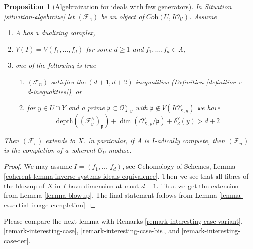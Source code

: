 \documentclass{stacks-project}
\theoremstyle{plain}
\newtheorem{proposition}[subsection]{Proposition}
\theoremstyle{definition}
\theoremstyle{remark}
\numberwithin{equation}{subsection}
\begin{document}
\begin{proposition}[Algebraization for ideals with few generators]
\label{proposition-d-generators}
In Situation \ref{situation-algebraize} let $(\mathcal{F}_n)$
be an object of $\textit{Coh}(U, I\mathcal{O}_U)$. Assume
\begin{enumerate}
\item $A$ has a dualizing complex,
\item $V(I) = V(f_1, \ldots, f_d)$ for some $d \geq 1$ and
$f_1, \ldots, f_d \in A$,
\item one of the following is true
\begin{enumerate}
\item $(\mathcal{F}_n)$ satisfies the $(d + 1, d + 2)$-inequalities
(Definition \ref{definition-s-d-inequalities}), or
\item for $y \in U \cap Y$ and a prime
$\mathfrak p \subset \mathcal{O}_{X, y}^\wedge$ with
$\mathfrak p \not \in V(I\mathcal{O}_{X, y}^\wedge)$
we have
$$
\text{depth}((\mathcal{F}^\wedge_y)_\mathfrak p) +
\dim(\mathcal{O}_{X, y}^\wedge/\mathfrak p) + \delta^Y_Z(y) > d + 2
$$
\end{enumerate}
\end{enumerate}
Then $(\mathcal{F}_n)$ extends to $X$. In particular, if $A$ is
$I$-adically complete, then $(\mathcal{F}_n)$ is the completion
of a coherent $\mathcal{O}_U$-module. 
\end{proposition}

\begin{proof}
We may assume $I = (f_1, \ldots, f_d)$, see
Cohomology of Schemes, Lemma
\ref{coherent-lemma-inverse-systems-ideals-equivalence}.
Then we see that
all fibres of the blowup of $X$ in $I$ have dimension at most $d - 1$.
Thus we get the extension from Lemma \ref{lemma-blowup}.
The final statement follows from Lemma \ref{lemma-essential-image-completion}.
\end{proof}

\noindent
Please compare the next lemma with
Remarks \ref{remark-interesting-case-variant},
\ref{remark-interesting-case},
\ref{remark-interesting-case-bis}, and
\ref{remark-interesting-case-ter}.
\end{document}
